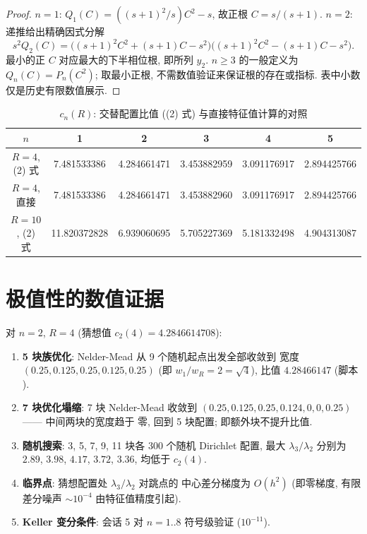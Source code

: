 \documentclass[UTF8]{ctexart}
\begin{document}
\begin{proof}
 $n=1$: $Q_1(C)=((s+1)^2/s)C^2-s$, 故正根 $C=s/(s+1)$.
 $n=2$: 递推给出精确因式分解
 \[
 s^2 Q_2(C)=\bigl((s+1)^2C^2+(s+1)C-s^2\bigr)
 \bigl((s+1)^2C^2-(s+1)C-s^2\bigr).
 \]
 最小的正 $C$ 对应最大的下半相位根, 即所列 $y_2$.
 $n\ge3$ 的一般定义为 $Q_n(C)=P_n(C^2)$; 取最小正根, 不需数值验证来保证根的存在或指标.
 表中小数仅是历史有限数值展示.
\end{proof}

\begin{table}[ht]
\centering
\caption{$c_n(R)$: 交替配置比值 ((2) 式) 与直接特征值计算的对照}
\begin{tabular}{c|ccccc}
	$n$ & 1 & 2 & 3 & 4 & 5 \\\hline
	$R=4$, (2) 式 & 7.481533386 & 4.284661471 & 3.453882959 & 3.091176917 & 2.894425766\\
	$R=4$, 直接 & 7.481533386 & 4.284661471 & 3.453882960 & 3.091176917 & 2.894425766\\
	$R=10$, (2) 式 & 11.820372828 & 6.939060695 & 5.705227369 & 5.181332498 & 4.904313087
\end{tabular}
\end{table}

\section{极值性的数值证据}

对 $n=2$, $R=4$ (猜想值 $c_2(4) = 4.2846614708$):
\begin{enumerate}
	\item \textbf{5 块族优化}: Nelder-Mead 从 9 个随机起点出发全部收敛到
		宽度 $(0.25, 0.125, 0.25, 0.125, 0.25)$ (即 $w_1/w_R = 2 =
		\sqrt 4$), 比值 $4.28466147$ (脚本 ).
	\item \textbf{7 块优化塌缩}: 7 块 Nelder-Mead 收敛到
		$(0.25, 0.125, 0.25, 0.124, 0, 0, 0.25)$ —— 中间两块的宽度趋于
		零, 回到 5 块配置; 即额外块不提升比值.
	\item \textbf{随机搜索}: 3, 5, 7, 9, 11 块各 300 个随机 Dirichlet
		配置, 最大 $\lambda_3/\lambda_2$ 分别为 $2.89$, $3.98$, $4.17$,
		$3.72$, $3.36$, 均低于 $c_2(4)$.
	\item \textbf{临界点}: 猜想配置处 $\lambda_3/\lambda_2$ 对跳点的
		中心差分梯度为 $O(h^2)$ (即零梯度, 有限差分噪声 $\sim
		10^{-4}$ 由特征值精度引起).
	\item \textbf{Keller 变分条件}: 会话 5 对 $n = 1..8$ 符号级验证
		($10^{-11}$).
\end{enumerate}
\end{document}
